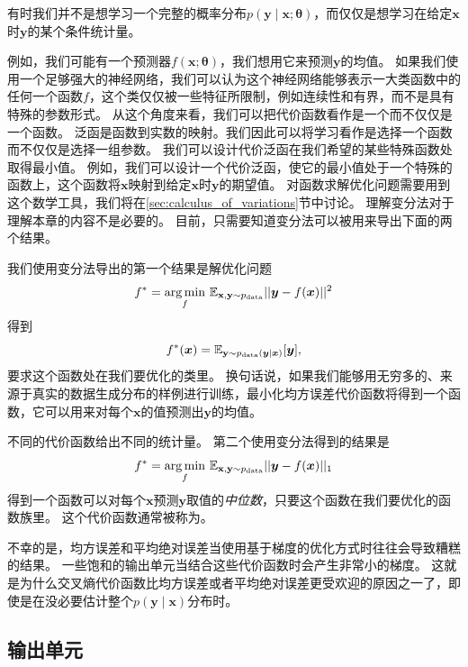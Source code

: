 有时我们并不是想学习一个完整的概率分布$p(\bm{y}\mid\bm{x}; \bm{\theta})$，而仅仅是想学习在给定$\bm{x}$时$\bm{y}$的某个条件统计量。

例如，我们可能有一个预测器$f(\bm{x}; \bm{\theta})$，我们想用它来预测$\bm{y}$的均值。
如果我们使用一个足够强大的神经网络，我们可以认为这个神经网络能够表示一大类函数中的任何一个函数$f$，这个类仅仅被一些特征所限制，例如连续性和有界，而不是具有特殊的参数形式。
从这个角度来看，我们可以把代价函数看作是一个而不仅仅是一个函数。
泛函是函数到实数的映射。我们因此可以将学习看作是选择一个函数而不仅仅是选择一组参数。
我们可以设计代价泛函在我们希望的某些特殊函数处取得最小值。
例如，我们可以设计一个代价泛函，使它的最小值处于一个特殊的函数上，这个函数将$\bm{x}$映射到给定$\bm{x}$时$\bm{y}$的期望值。
对函数求解优化问题需要用到这个数学工具，我们将在\ref{sec:calculus_of_variations}节中讨论。
理解变分法对于理解本章的内容不是必要的。
目前，只需要知道变分法可以被用来导出下面的两个结果。


我们使用变分法导出的第一个结果是解优化问题
\begin{equation}
f^* = \underset{f}{\arg\min}  \ \mathbb{E}_{\mathbf{x}, \mathbf{y} \sim  p_\text{data}} ||\bm{y}-f(\bm{x})||^2
\end{equation}
得到
\begin{equation}
f^*(\bm{x}) = \mathbb{E}_{\mathbf{y}\sim p_\text{data}(\bm{y}|\bm{x})} [\bm{y}],
\end{equation}
要求这个函数处在我们要优化的类里。
换句话说，如果我们能够用无穷多的、来源于真实的数据生成分布的样例进行训练，最小化均方误差代价函数将得到一个函数，它可以用来对每个$\bm{x}$的值预测出$\bm{y}$的均值。

不同的代价函数给出不同的统计量。
第二个使用变分法得到的结果是
\begin{equation}
f^* = \underset{f}{\arg\min} \ \mathbb{E}_{\mathbf{x}, \mathbf{y} \sim  p_\text{data}} ||\bm{y} - f(\bm{x})||_1
\end{equation}
得到一个函数可以对每个$\bm{x}$预测$\bm{y}$取值的\emph{中位数}，只要这个函数在我们要优化的函数族里。
这个代价函数通常被称为。

不幸的是，均方误差和平均绝对误差当使用基于梯度的优化方式时往往会导致糟糕的结果。
一些饱和的输出单元当结合这些代价函数时会产生非常小的梯度。
这就是为什么交叉熵代价函数比均方误差或者平均绝对误差更受欢迎的原因之一了，即使是在没必要估计整个$p(\bm{y}\mid\bm{x})$分布时。


\subsection{输出单元}
\label{sec:output_units}

